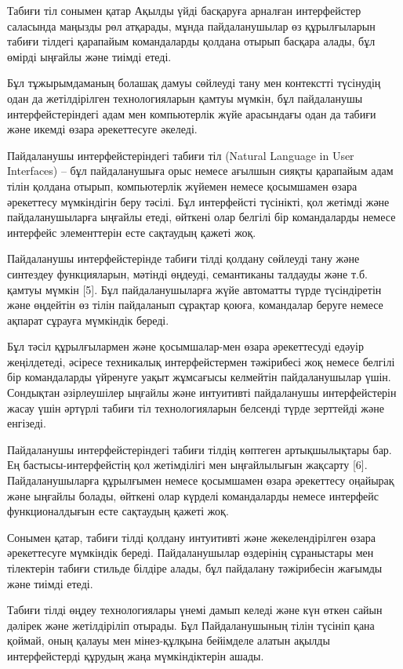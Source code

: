 \begin{multicols}{2}
Табиғи тіл сонымен қатар Ақылды үйді басқаруға арналған интерфейстер
саласында маңызды рөл атқарады, мұнда пайдаланушылар өз құрылғыларын
табиғи тілдегі қарапайым командаларды қолдана отырып басқара алады, бұл
өмірді ыңғайлы және тиімді етеді.

Бұл тұжырымдаманың болашақ дамуы сөйлеуді тану мен контекстті түсінудің
одан да жетілдірілген технологияларын қамтуы мүмкін, бұл пайдаланушы
интерфейстеріндегі адам мен компьютерлік жүйе арасындағы одан да табиғи
және икемді өзара әрекеттесуге әкеледі.

Пайдаланушы интерфейстеріндегі табиғи тіл (Natural Language in User
Interfaces) -- бұл пайдаланушыға орыс немесе ағылшын сияқты қарапайым
адам тілін қолдана отырып, компьютерлік жүйемен немесе қосымшамен өзара
әрекеттесу мүмкіндігін беру тәсілі. Бұл интерфейсті түсінікті, қол
жетімді және пайдаланушыларға ыңғайлы етеді, өйткені олар белгілі бір
командаларды немесе интерфейс элементтерін есте сақтаудың қажеті жоқ.

Пайдаланушы интерфейстерінде табиғи тілді қолдану сөйлеуді тану және
синтездеу функцияларын, мәтінді өңдеуді, семантиканы талдауды және т.б.
қамтуы мүмкін {[}5{]}. Бұл пайдаланушыларға жүйе автоматты түрде
түсіндіретін және өңдейтін өз тілін пайдаланып сұрақтар қоюға,
командалар беруге немесе ақпарат сұрауға мүмкіндік береді.

Бұл тәсіл құрылғылармен және қосымшалар-мен өзара әрекеттесуді едәуір
жеңілдетеді, әсіресе техникалық интерфейстермен тәжірибесі жоқ немесе
белгілі бір командаларды үйренуге уақыт жұмсағысы келмейтін
пайдаланушылар үшін. Сондықтан әзірлеушілер ыңғайлы және интуитивті
пайдаланушы интерфейстерін жасау үшін әртүрлі табиғи тіл технологияларын
белсенді түрде зерттейді және енгізеді.

Пайдаланушы интерфейстеріндегі табиғи тілдің көптеген артықшылықтары
бар. Ең бастысы-интерфейстің қол жетімділігі мен ыңғайлылығын жақсарту
{[}6{]}. Пайдаланушыларға құрылғымен немесе қосымшамен өзара әрекеттесу
оңайырақ және ыңғайлы болады, өйткені олар күрделі командаларды немесе
интерфейс функционалдығын есте сақтаудың қажеті жоқ.

Сонымен қатар, табиғи тілді қолдану интуитивті және жекелендірілген
өзара әрекеттесуге мүмкіндік береді. Пайдаланушылар өздерінің
сұраныстары мен тілектерін табиғи стильде білдіре алады, бұл пайдалану
тәжірибесін жағымды және тиімді етеді.

Табиғи тілді өңдеу технологиялары үнемі дамып келеді және күн өткен
сайын дәлірек және жетілдіріліп отырады. Бұл Пайдаланушының тілін
түсініп қана қоймай, оның қалауы мен мінез-құлқына бейімделе алатын
ақылды интерфейстерді құрудың жаңа мүмкіндіктерін ашады.


\end{multicols}
